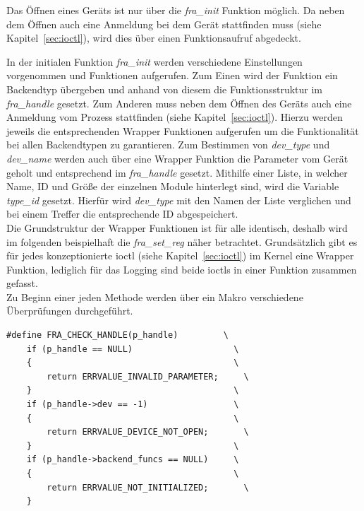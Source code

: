 Das Öffnen eines Geräts ist nur über die \textit{fra\_init} Funktion möglich. Da neben dem Öffnen auch eine Anmeldung bei dem Gerät stattfinden muss (siehe Kapitel~\ref{sec:ioctl}), wird dies über einen Funktionsaufruf abgedeckt. 

In der initialen Funktion \textit{fra\_init} werden verschiedene Einstellungen vorgenommen und Funktionen aufgerufen. Zum Einen wird der Funktion ein Backendtyp übergeben und anhand von diesem die Funktionsstruktur im \textit{fra\_handle} gesetzt.
Zum Anderen muss neben dem Öffnen des Geräts auch eine Anmeldung vom Prozess stattfinden (siehe Kapitel~\ref{sec:ioctl}). Hierzu werden jeweils die entsprechenden Wrapper Funktionen aufgerufen um die Funktionalität bei allen Backendtypen zu garantieren. Zum Bestimmen von \textit{dev\_type} und \textit{dev\_name} werden auch über eine Wrapper Funktion die Parameter vom Gerät geholt und entsprechend im \textit{fra\_handle} gesetzt. Mithilfe einer Liste, in welcher Name, ID und Größe der einzelnen Module hinterlegt sind, wird die Variable \textit{type\_id} gesetzt. Hierfür wird \textit{dev\_type} mit den Namen der Liste verglichen und bei einem Treffer die entsprechende ID abgespeichert.\\


Die Grundstruktur der Wrapper Funktionen ist für alle identisch, deshalb wird im folgenden beispielhaft die \textit{fra\_set\_reg} näher betrachtet. Grundsätzlich gibt es für jedes konzeptionierte \ac{ioctl} (siehe Kapitel~\ref{sec:ioctl}) im Kernel eine Wrapper Funktion, lediglich für das Logging sind beide \ac{ioctl}s in einer Funktion zusammen gefasst.\\ 


Zu Beginn einer jeden Methode werden über ein Makro verschiedene Überprüfungen durchgeführt. 

\begin{lstfloat}
\begin{lstlisting}
#define FRA_CHECK_HANDLE(p_handle)         \
	if (p_handle == NULL)                    \
	{                                        \
		return ERRVALUE_INVALID_PARAMETER;     \
	}                                        \
	if (p_handle->dev == -1)                 \
	{                                        \
		return ERRVALUE_DEVICE_NOT_OPEN;       \
	}                                        \
	if (p_handle->backend_funcs == NULL)     \
	{                                        \
		return ERRVALUE_NOT_INITIALIZED;       \
	}  
\end{lstlisting}
\end{lstfloat}

